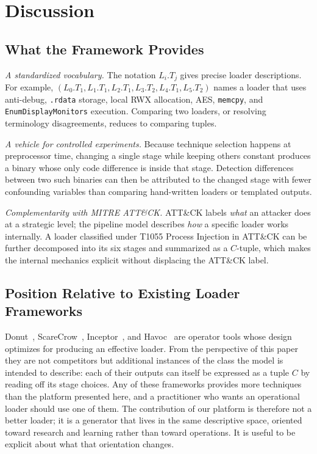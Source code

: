 \section{Discussion}

\subsection{What the Framework Provides}

\textit{A standardized vocabulary.}
The notation $L_i.T_j$ gives precise loader descriptions.
For example, $(L_0.T_1, L_1.T_1, L_2.T_1, L_3.T_2, L_4.T_1, L_5.T_2)$ names a loader that uses anti-debug, \texttt{.rdata} storage, local RWX allocation, AES, \texttt{memcpy}, and \texttt{EnumDisplayMonitors} execution.
Comparing two loaders, or resolving terminology disagreements, reduces to comparing tuples.

\textit{A vehicle for controlled experiments.}
Because technique selection happens at preprocessor time, changing a single stage while keeping others constant produces a binary whose only code difference is inside that stage.
Detection differences between two such binaries can then be attributed to the changed stage with fewer confounding variables than comparing hand-written loaders or templated outputs.

\textit{Complementarity with MITRE ATT\&CK.}
ATT\&CK labels \emph{what} an attacker does at a strategic level; the pipeline model describes \emph{how} a specific loader works internally.
A loader classified under T1055 Process Injection in ATT\&CK can be further decomposed into its six stages and summarized as a $C$-tuple, which makes the internal mechanics explicit without displacing the ATT\&CK label.

\subsection{Position Relative to Existing Loader Frameworks}

Donut~\cite{donut}, ScareCrow~\cite{scarecrow}, Inceptor~\cite{inceptor}, and Havoc~\cite{havoc} are operator tools whose design optimizes for producing an effective loader.
From the perspective of this paper they are not competitors but additional instances of the class the model is intended to describe: each of their outputs can itself be expressed as a tuple $C$ by reading off its stage choices.
Any of these frameworks provides more techniques than the platform presented here, and a practitioner who wants an operational loader should use one of them.
The contribution of our platform is therefore not a better loader; it is a generator that lives in the same descriptive space, oriented toward research and learning rather than toward operations.
It is useful to be explicit about what that orientation changes.

